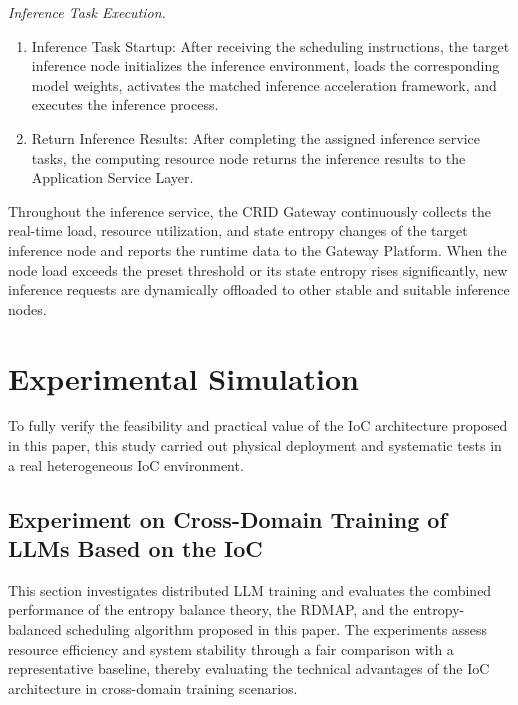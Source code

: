 \documentclass{ccjnl}
\begin{document}
\par
{}
\noindent\textit{Inference Task Execution.}\par

\begin{enumerate}[nosep,label=\arabic*)]
	\item Inference Task Startup: After receiving the scheduling instructions, the target inference node initializes the inference environment, loads the corresponding model weights, activates the matched inference acceleration framework, and executes the inference process.
	
	\item Return Inference Results: After completing the assigned inference service tasks, the computing resource node returns the inference results to the Application Service Layer.
\end{enumerate}

Throughout the inference service, the CRID Gateway continuously collects the real-time load, resource utilization, and state entropy changes of the target inference node and reports the runtime data to the Gateway Platform. When the node load exceeds the preset threshold or its state entropy rises significantly, new inference requests are dynamically offloaded to other stable and suitable inference nodes.


\section{Experimental Simulation}
\raggedbottom
\label{s6}

To fully verify the feasibility and practical value of the IoC architecture proposed in this paper, this study carried out physical deployment and systematic tests in a real heterogeneous IoC environment.

\subsection{Experiment on Cross-Domain Training of LLMs Based on the IoC}
\label{s6-1}

This section investigates distributed LLM training and evaluates the combined performance of the entropy balance theory, the RDMAP, and the entropy-balanced scheduling algorithm proposed in this paper. The experiments assess resource efficiency and system stability through a fair comparison with a representative baseline, thereby evaluating the technical advantages of the IoC architecture in cross-domain training scenarios.
\end{document}
